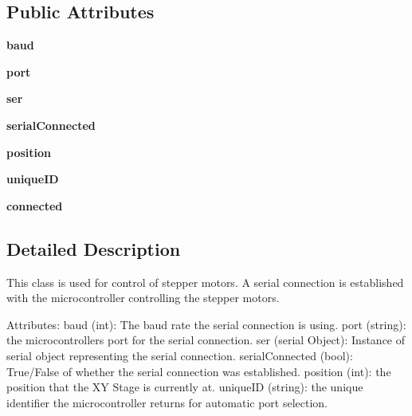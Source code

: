 \subsection*{Public Attributes}
\begin{DoxyCompactItemize}
\item 
\mbox{\label{class_collection_1_1_collectador_a06c835183d4c66cf6c91c2e34ee3e2b6}} 
{\bfseries baud}
\item 
\mbox{\label{class_collection_1_1_collectador_a550345b45c253014500953908ed1a995}} 
{\bfseries port}
\item 
\mbox{\label{class_collection_1_1_collectador_ad9a27d34d324f18bffea08b5aee3a765}} 
{\bfseries ser}
\item 
\mbox{\label{class_collection_1_1_collectador_a6118ba10835a3655e0a048fadf444942}} 
{\bfseries serial\+Connected}
\item 
\mbox{\label{class_collection_1_1_collectador_aa037ff041a29101bf42cde6fdb21061c}} 
{\bfseries position}
\item 
\mbox{\label{class_collection_1_1_collectador_a13c3d036cddedace173688b51df275d5}} 
{\bfseries unique\+ID}
\item 
\mbox{\label{class_collection_1_1_collectador_a63f1c56b2b8bc80791fae03b9f6026ef}} 
{\bfseries connected}
\end{DoxyCompactItemize}


\subsection{Detailed Description}
\begin{DoxyVerb}This class is used for control of stepper motors. A serial connection is established with the microcontroller controlling the stepper motors.

Attributes:
    baud (int): The baud rate the serial connection is using.
    port (string): the microcontrollers port for the serial connection.
    ser (serial Object): Instance of serial object representing the serial connection.
    serialConnected (bool): True/False of whether the serial connection was established.
    position (int): the position that the XY Stage is currently at.
    uniqueID (string): the unique identifier the microcontroller returns for automatic port selection.
\end{DoxyVerb}
 

